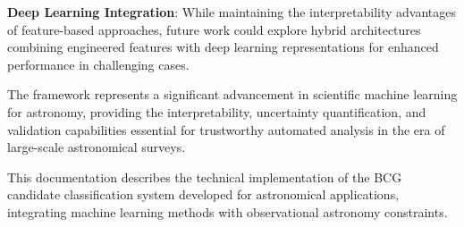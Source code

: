 \documentclass[twocolumn,10pt]{aastex631}
\begin{document}
\textbf{Deep Learning Integration}: While maintaining the interpretability advantages of feature-based approaches, future work could explore hybrid architectures combining engineered features with deep learning representations for enhanced performance in challenging cases.

The framework represents a significant advancement in scientific machine learning for astronomy, providing the interpretability, uncertainty quantification, and validation capabilities essential for trustworthy automated analysis in the era of large-scale astronomical surveys.

\begin{acknowledgments}
This documentation describes the technical implementation of the BCG candidate classification system developed for astronomical applications, integrating machine learning methods with observational astronomy constraints.
\end{acknowledgments}



\end{document}
